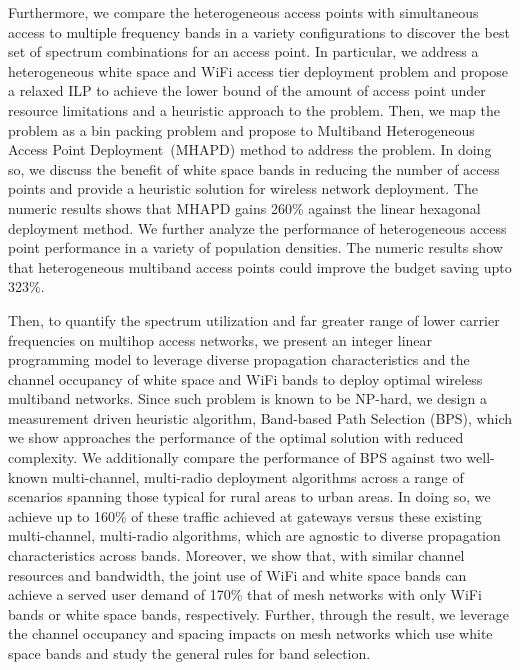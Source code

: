 Furthermore, we compare the heterogeneous access points with simultaneous access to multiple frequency bands 
in a variety configurations to discover the best set of spectrum combinations 
for an access point. In particular, we address a heterogeneous white space and 
WiFi access tier deployment problem and propose a relaxed ILP to achieve the lower 
bound of the amount of access point under resource limitations and a heuristic 
approach to the problem. Then, we map the problem as a bin packing problem and 
propose to Multiband Heterogeneous Access Point Deployment~(MHAPD) method to address
the problem. In doing so, we discuss the benefit of white space bands 
in reducing the number of access points and provide a heuristic solution for 
wireless network deployment. The numeric results shows that MHAPD gains 260\% 
against the linear hexagonal deployment method.  We further analyze the performance 
of heterogeneous access point performance in a variety of population densities. 
The numeric results show that heterogeneous multiband access points could improve the budget 
saving upto 323\%. 

Then, to quantify the spectrum utilization and far greater range of lower carrier 
frequencies on multihop access networks, 
we present an integer 
linear programming model to leverage diverse propagation characteristics and 
the  channel occupancy of white space and WiFi bands to deploy optimal wireless multiband 
networks. Since such problem is known to be NP-hard, we design a measurement driven 
heuristic algorithm, Band-based Path Selection (BPS), which we show approaches 
the performance of the optimal solution with reduced complexity.  We additionally 
compare the performance of BPS against two well-known multi-channel, multi-radio 
deployment algorithms across a range of scenarios spanning those typical for 
rural areas to urban areas. In doing so, we achieve up to 160\% of these traffic achieved 
at gateways versus these existing multi-channel, multi-radio algorithms, which are 
agnostic to diverse propagation characteristics across bands.  Moreover, we show 
that, with similar channel resources and bandwidth, the joint use of WiFi and 
white space bands can achieve a served user demand of 170\% that of mesh networks 
with only WiFi bands or white space bands, respectively. Further, through the 
result, we leverage the channel occupancy and spacing impacts on mesh
networks which use white space bands and study the general rules for band selection.

